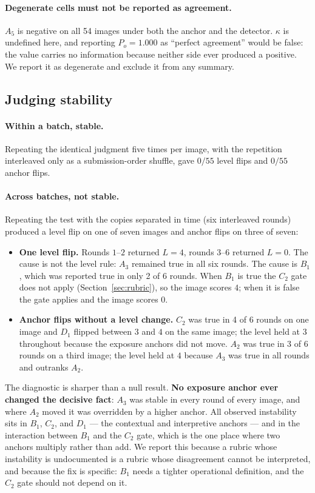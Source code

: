 \documentclass[11pt]{article}
\begin{document}
\paragraph{Degenerate cells must not be reported as agreement.} $A_5$ is negative on all 54 images under both the anchor and the detector. $\kappa$ is undefined here, and reporting $P_o=1.000$ as ``perfect agreement'' would be false: the value carries no information because neither side ever produced a positive. We report it as degenerate and exclude it from any summary.

\subsection{Judging stability}
\paragraph{Within a batch, stable.} Repeating the identical judgment five times per image, with the repetition interleaved only as a submission-order shuffle, gave $0/55$ level flips and $0/55$ anchor flips.

\paragraph{Across batches, not stable.} Repeating the test with the copies separated in time (six interleaved rounds) produced a level flip on one of seven images and anchor flips on three of seven:
\begin{itemize}\itemsep1pt
\item \textbf{One level flip.} Rounds $1$--$2$ returned $L=4$, rounds $3$--$6$ returned $L=0$. The cause is not the level rule: $A_3$ remained true in all six rounds. The cause is $B_1$, which was reported true in only 2 of 6 rounds. When $B_1$ is true the $C_2$ gate does not apply (Section~\ref{sec:rubric}), so the image scores $4$; when it is false the gate applies and the image scores $0$.
\item \textbf{Anchor flips without a level change.} $C_2$ was true in 4 of 6 rounds on one image and $D_1$ flipped between $3$ and $4$ on the same image; the level held at $3$ throughout because the exposure anchors did not move. $A_2$ was true in 3 of 6 rounds on a third image; the level held at $4$ because $A_3$ was true in all rounds and outranks $A_2$.
\end{itemize}
The diagnostic is sharper than a null result. \textbf{No exposure anchor ever changed the decisive fact}: $A_3$ was stable in every round of every image, and where $A_2$ moved it was overridden by a higher anchor. All observed instability sits in $B_1$, $C_2$, and $D_1$ --- the contextual and interpretive anchors --- and in the interaction between $B_1$ and the $C_2$ gate, which is the one place where two anchors multiply rather than add. We report this because a rubric whose instability is undocumented is a rubric whose disagreement cannot be interpreted, and because the fix is specific: $B_1$ needs a tighter operational definition, and the $C_2$ gate should not depend on it.
\end{document}
